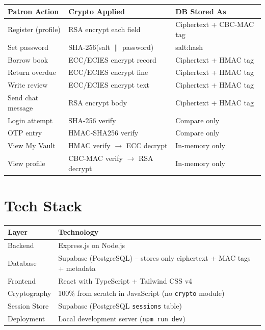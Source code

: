 \documentclass[12pt]{article}
\begin{document}
\begin{center}
\renewcommand{\arraystretch}{1.3}
\begin{tabular}{lll}
    \toprule
    \textbf{Patron Action} & \textbf{Crypto Applied} & \textbf{DB Stored As} \\
    \midrule
    Register (profile)     & RSA encrypt each field     & Ciphertext + CBC-MAC tag \\
    Set password           & SHA-256(salt $\|$ password) & salt:hash \\
    Borrow book            & ECC/ECIES encrypt record   & Ciphertext + HMAC tag \\
    Return overdue         & ECC/ECIES encrypt fine     & Ciphertext + HMAC tag \\
    Write review           & ECC/ECIES encrypt text     & Ciphertext + HMAC tag \\
    Send chat message      & RSA encrypt body           & Ciphertext + HMAC tag \\
    Login attempt          & SHA-256 verify             & Compare only \\
    OTP entry              & HMAC-SHA256 verify         & Compare only \\
    View My Vault          & HMAC verify $\rightarrow$ ECC decrypt & In-memory only \\
    View profile           & CBC-MAC verify $\rightarrow$ RSA decrypt & In-memory only \\
    \bottomrule
\end{tabular}
\end{center}

\section{Tech Stack}

\begin{center}
\begin{tabular}{ll}
    \toprule
    \textbf{Layer} & \textbf{Technology} \\
    \midrule
    Backend        & Express.js on Node.js \\
    Database       & Supabase (PostgreSQL) -- stores only ciphertext + MAC tags + metadata \\
    Frontend       & React with TypeScript + Tailwind CSS v4 \\
    Cryptography   & 100\% from scratch in JavaScript (no \texttt{crypto} module) \\
    Session Store  & Supabase (PostgreSQL \texttt{sessions} table) \\
    Deployment     & Local development server (\texttt{npm run dev}) \\
    \bottomrule
\end{tabular}
\end{center}
\end{document}

